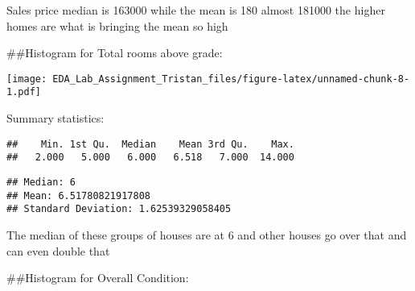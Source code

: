 \documentclass[
]{article}
\newenvironment{Shaded}{\begin{snugshade}}{\end{snugshade}}
\newcommand{\AttributeTok}[1]{\textcolor[rgb]{0.13,0.29,0.53}{#1}}
\newcommand{\FloatTok}[1]{\textcolor[rgb]{0.00,0.00,0.81}{#1}}
\newcommand{\FunctionTok}[1]{\textcolor[rgb]{0.13,0.29,0.53}{\textbf{#1}}}
\newcommand{\NormalTok}[1]{#1}
\newcommand{\OtherTok}[1]{\textcolor[rgb]{0.56,0.35,0.01}{#1}}
\newcommand{\SpecialCharTok}[1]{\textcolor[rgb]{0.81,0.36,0.00}{\textbf{#1}}}
\newcommand{\StringTok}[1]{\textcolor[rgb]{0.31,0.60,0.02}{#1}}
\begin{document}
Sales price median is 163000 while the mean is 180 almost 181000 the
higher homes are what is bringing the mean so high

\#\#Histogram for Total rooms above grade:

\begin{Shaded}
\end{Shaded}

\texttt{[image: EDA\_Lab\_Assignment\_Tristan\_files/figure-latex/unnamed-chunk-8-1.pdf]}

Summary statistics:

\begin{Shaded}
\end{Shaded}

\begin{verbatim}
##    Min. 1st Qu.  Median    Mean 3rd Qu.    Max. 
##   2.000   5.000   6.000   6.518   7.000  14.000
\end{verbatim}

\begin{verbatim}
## Median: 6
## Mean: 6.51780821917808
## Standard Deviation: 1.62539329058405
\end{verbatim}

The median of these groups of houses are at 6 and other houses go over
that and can even double that

\#\#Histogram for Overall Condition:
\end{document}
